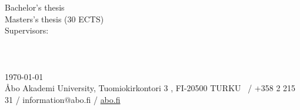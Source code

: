 \documentclass[
12pt, %
oneside, %
english, %
onehalfspacing, %
nolistspacing, %
headsepline, %
chapterinoneline, %
]{MastersDoctoralThesis} %
\begin{document}
\begin{titlepage}
\begin{bottompar}
        \begin{flushright}
            \ifdefined\swedishthesis
                Bachelor's thesis  \\
            \else
                Masters's thesis (30 ECTS)  \\
                Supervisors: \supname \\
            \fi
            \deptname \\
            \facname \\
            \univname \\
            \today\\%
            \vspace{5 mm}
            {\fontsize{8pt}{1em}\selectfont Åbo Akademi University, Tuomiokirkontori 3 , FI-20500 TURKU  ~/ +358 2 215 31 / information@abo.fi  / \href{http://abo.fi}{abo.fi}
            }
        \end{flushright}
    \end{bottompar}

\end{titlepage}
\restoregeometry



\end{document}

